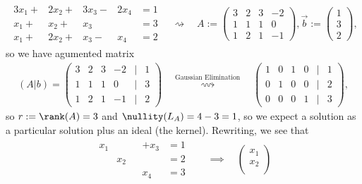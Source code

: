 \begin{example}
    \begin{align*}
        \begin{matrix}
            3x_1 + &2x_2 + &3x_3 - &2 x_4 &= 1\\
            x_1 + &x_2 + &x_3& &= 3\\
            x_1 + &2x_2 + &x_3 - &x_4 &= 2
        \end{matrix} 
        \quad \rightsquigarrow \quad A := \begin{pmatrix}
            3 & 2 & 3 & -2\\
            1 & 1 & 1 & 0\\
            1 & 2 & 1 & -1
        \end{pmatrix}, \vec{b} := \begin{pmatrix}
            1\\
            3\\
            2
        \end{pmatrix},
    \end{align*}
    so we have agumented matrix \begin{align*}
        (A \vert b) = \begin{pmatrix}
            3 & 2 & 3 & -2 & \vert &1 \\
            1 & 1 & 1 & 0 &\vert &3\\
            1 & 2 & 1 & -1 & \vert& 2
        \end{pmatrix} \quad \overset{\text{Gaussian Elimination}}{\rightsquigarrow} \quad \begin{pmatrix}
            1 & 0 & 1 & 0 & \vert &1\\
            0 & 1 & 0 & 0 & \vert & 2\\
            0 & 0 & 0 & 1 & \vert &3
        \end{pmatrix},
    \end{align*}
    so $r := \rank (A) = 3$ and $\nullity(L_A) = 4 - 3 = 1$, so we expect a solution as a particular solution plus an ideal (the kernel). Rewriting, we see that \begin{align*}
        \begin{matrix}
            x_1  & & &+x_3 &= 1\\
            & x_2 & & &= 2\\
            & & & x_4 &= 3
        \end{matrix} \quad &\implies \quad \begin{pmatrix}
            x_1\\
            x_2\\

\end{pmatrix}
\end{align*}
\end{example}
